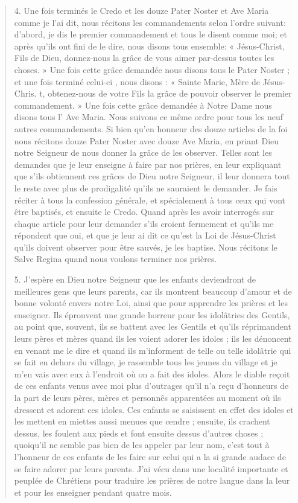 \begin{quote}
4. Une fois terminés le Credo et les douze Pater Noster et Ave
Maria comme je l'ai dit, nous récitons les commandements selon
l'ordre suivant: d'abord, je dis le premier commandement et tous
le disent comme moi; et après qu'ils ont fini de le dire, nous disons
tous ensemble: « Jésus-Christ, Fils de Dieu, donnez-nous la grâce
de vous aimer par-dessus toutes les choses. » Une fois cette grâce
demandée nous disons tous le Pater Noster ; et une fois terminé
celui-ci , nous disons : « Sainte Marie, Mère de Jésus-Chris. t,
obtenez-nous de votre Fils la grâce de pouvoir observer le premier
commandement. » Une fois cette grâce demandée à Notre Dame
nous disons tous l' Ave Maria. Nous suivons ce même ordre pour
tous les neuf autres commandements. Si bien qu'en honneur des
douze articles de la foi nous récitons douze Pater Noster avec douze
Ave Maria, en priant Dieu notre Seigneur de nous donner  la grâce de les observer. Telles sont les demandes que je leur enseigne
à faire par nos prières, en leur expliquant que s'ils obtiennent
ces grâces de Dieu notre Seigneur, il leur donnera tout le reste avec
plus de prodigalité qu'ils ne sauraient le demander. Je fais réciter
à tous la confession générale, et spécialement à tous ceux qui vont
être baptisés, et ensuite le Credo. Quand après les avoir interrogés
sur chaque article pour leur demander s'ils croient fermement
et qu'ils me répondent que oui, et que je leur ai dit ce qu'est la Loi
de Jésus-Christ qu'ils doivent observer pour être sauvés, je les baptise.
Nous récitons le Salve Regina quand nous voulons terminer
nos prières.


5. J'espère en Dieu notre Seigneur que les enfants deviendront
de meilleures gens que leurs parents, car ils montrent beaucoup
d'amour et de bonne volonté envers notre Loi, ainsi que pour
apprendre les prières et les enseigner. Ils éprouvent une grande horreur
pour les idolâtries des Gentils, au point que, souvent, ils se
battent avec les Gentils et qu'ils réprimandent leurs pères et mères
quand ils les voient adorer les idoles ; ils les dénoncent en venant
me le dire et quand ils m'informent de telle ou telle idolâtrie qui
se fait en dehors du village, je rassemble tous les jeunes du village
et je m'en vais avec eux à l'endroit où on a fait des idoles. Alors
le diable reçoit de ces enfants venus avec moi plus d'outrages qu'il
n'a reçu d'honneurs de la part de leurs pères, mères et personnês
apparentées au moment où ils dressent et adorent ces idoles. Ces
enfants se saisissent en effet des idoles et les mettent en miettes
aussi menues que cendre ; ensuite, ils crachent dessus, les foulent
aux pieds et font ensuite dessus d'autres choses ; quoiqu'il ne semble
pas bien de les appeler par leur nom, c'est tout à l'honneur de
ces enfants de les faire sur celui qui a la si grande audace de se faire
adorer par leurs parents. J'ai vécu dans une localité importante et
peuplée de Chrétiens pour traduire les prières de notre langue dans
la leur et pour les enseigner pendant quatre mois.



\end{quote}
